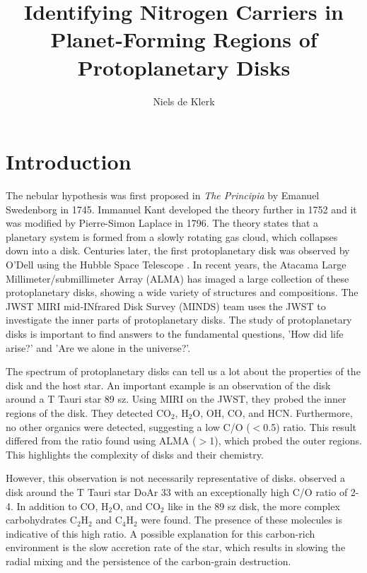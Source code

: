 \documentclass[twoside,single, authoryear, semicolon]{lion-msc}
\title{Identifying Nitrogen Carriers in Planet-Forming Regions of Protoplanetary Disks}
\author{Niels de Klerk}
\affiliation{Leiden Observatory, Universiteit Leiden}
\date{\displaydate{date}}
\begin{document}

\maketitle

\tableofcontents
\cleardoublepage
{}
\chapter{Introduction}
The nebular hypothesis was first proposed in \textit{The Principia} by Emanuel Swedenborg in 1745. Immanuel Kant developed the theory further in 1752 and it was modified by Pierre-Simon Laplace in 1796. The theory states that a planetary system is formed from a slowly rotating gas cloud, which collapses down into a disk. Centuries later, the first protoplanetary disk was observed by O'Dell using the Hubble Space Telescope \citep{ODell1993}. In recent years, the Atacama Large Millimeter/submillimeter Array (ALMA) has imaged a large collection of these protoplanetary disks, showing a wide variety of structures and compositions. The JWST MIRI mid-INfrared Disk Survey (MINDS) team uses the JWST to investigate the inner parts of protoplanetary disks. The study of protoplanetary disks is important to find answers to the fundamental questions, 'How did life arise?' and 'Are we alone in the universe?'.

The spectrum of protoplanetary disks can tell us a lot about the properties of the disk and the host star. An important example is an observation of the disk around a T Tauri star 89 sz\cite{Gasman_2023}. Using MIRI on the JWST, they probed the inner regions of the disk. They detected CO$_2$, H$_2$O, OH, CO, and HCN. Furthermore, no other organics were detected, suggesting a low C/O ($<$0.5) ratio. This result differed from the ratio found using ALMA ($>$1), which probed the outer regions. This highlights the complexity of disks and their chemistry.

However, this observation is not necessarily representative of disks. \cite{colmenares2024jwstmiridetectioncarbonrichchemistry} observed a disk around the T Tauri star DoAr 33 with an exceptionally high C/O ratio of 2-4. In addition to CO, H$_2$O, and CO$_2$ like in the 89 sz disk, the more complex carbohydrates C$_2$H$_2$ and C$_4$H$_2$ were found. The presence of these molecules is indicative of this high ratio. A possible explanation for this carbon-rich environment is the slow accretion rate of the star, which results in slowing the radial mixing and the persistence of the carbon-grain destruction.
\end{document}
